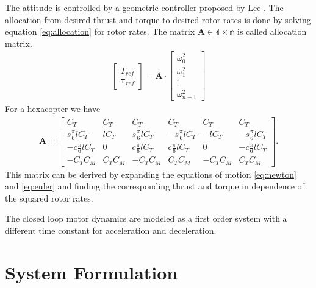The attitude is controlled by a geometric controller proposed by Lee \cite{Lee2010}. The allocation from desired thrust and torque to desired rotor rates is done by solving equation \ref{eq:allocation} for rotor rates. The matrix $\mathbf{A} \in \mathbb{4\times n}$ is called allocation matrix.
\begin{align}
\begin{bmatrix}
T_{ref} \\ \boldsymbol{\tau}_{ref}
\end{bmatrix} = \mathbf{A} \cdot \begin{bmatrix}
\omega_0^2 \\ \omega_1^2 \\ \vdots \\ \omega_{n-1}^2
\end{bmatrix} \label{eq:allocation} 
\end{align}
For a hexacopter we have
\begin{align}
\mathbf{A} = \begin{bmatrix}
C_T & C_T & C_T & C_T & C_T & C_T \\
s\frac{\pi}{6} l C_T &   l C_T &  s\frac{\pi}{6} l C_T & -s\frac{\pi}{6} l C_T & -l C_T & -s\frac{\pi}{6} l C_T \\
-c\frac{\pi}{6} l C_T &  0 & c\frac{\pi}{6} l C_T &  c\frac{\pi}{6} l C_T &  0 & -c\frac{\pi}{6} l C_T \\
-C_T C_M &  C_T C_M &  -C_T C_M &   C_T C_M & -C_T C_M &  C_T C_M
\end{bmatrix}.
\end{align}
This matrix can be derived by expanding the equations of motion \ref{eq:newton} and \ref{eq:euler} and finding the corresponding thrust and torque in dependence of the squared rotor rates.

The closed loop motor dynamics are modeled as a first order system with a different time constant for acceleration and deceleration.
%
\section{System Formulation}


